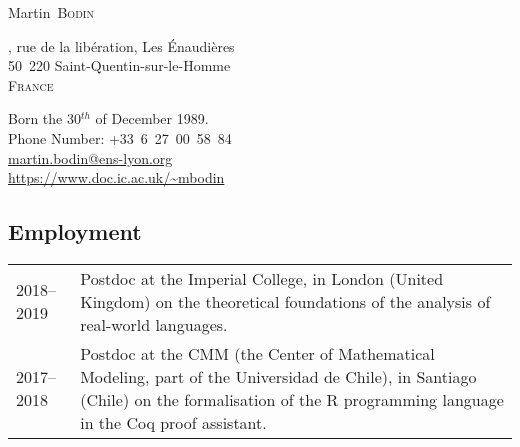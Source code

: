 \documentclass[12pt,a4paper]{article}
\makeatletter
\newcommand{\es}[1]{\foreignlanguage{spanish}{{#1}}}
\newcommand{\es}[1]{\foreignlanguage{spanish}{{#1}}}
\newenvironment{datecvsection}[1]%
               {\subsection*{#1}%
                 \noindent \begin{tabular}{@{}p{\annee}p{\texte}@{}}}
               {\end{tabular}}
\newcommand\familyName{\textsc}
\newcommand\placeName{}
\makeatother
\begin{document}
\pagestyle{empty}


\newlength{\annee}
\settowidth{\annee}{9999—9999} %


\newlength{\texte}
\setlength{\texte}{\textwidth} \addtolength{\texte}{-\annee} 
	\addtolength{\texte}{-2\tabcolsep}

\begin{center} \Huge Martin~\familyName{Bodin} \end{center}

\parbox{0.5\textwidth}
{
  , rue de la libération,
  Les Énaudières \\
  50~220 Saint-Quentin-sur-le-Homme \\
  \textsc{France}
}
\parbox{.55\textwidth}
{
\begin{flushright}
  Born the 30\(^{th}\) of December 1989. \\
  \noindent Phone Number: \mbox{+33 6 27 00 58 84} \\
  \url{martin.bodin@ens-lyon.org} \\
  \url{https://www.doc.ic.ac.uk/~mbodin}
\end{flushright}
}


\begin{datecvsection}{Employment}

    2018–2019 & Postdoc at the \placeName{Imperial College}, in \placeName{London} (\placeName{United Kingdom}) on the theoretical foundations of the analysis of real-world languages. \\

    2017–2018 & Postdoc at the {CMM} (the Center of Mathematical Modeling, part of the \es{\placeName{Universidad de Chile}}), in \placeName{Santiago} (\placeName{Chile}) on the formalisation of the R programming language in the Coq proof assistant. \\

\end{datecvsection}
\end{document}
